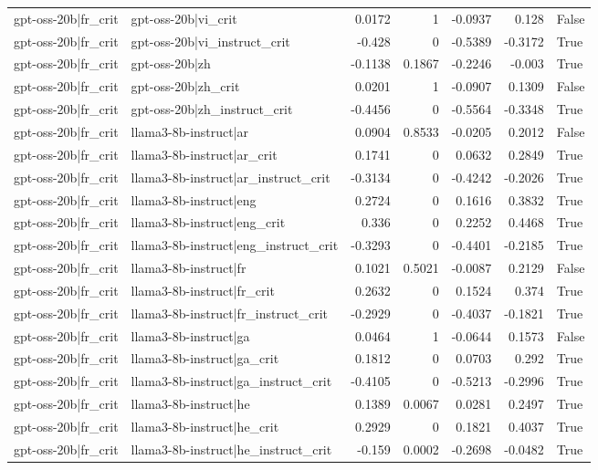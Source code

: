 \begin{table}
\begin{tabular}{l l r r r r l}
gpt-oss-20b|fr_crit & gpt-oss-20b|vi_crit & 0.0172 & 1 & -0.0937 & 0.128 & False \\
gpt-oss-20b|fr_crit & gpt-oss-20b|vi_instruct_crit & -0.428 & 0 & -0.5389 & -0.3172 & True \\
gpt-oss-20b|fr_crit & gpt-oss-20b|zh & -0.1138 & 0.1867 & -0.2246 & -0.003 & True \\
gpt-oss-20b|fr_crit & gpt-oss-20b|zh_crit & 0.0201 & 1 & -0.0907 & 0.1309 & False \\
gpt-oss-20b|fr_crit & gpt-oss-20b|zh_instruct_crit & -0.4456 & 0 & -0.5564 & -0.3348 & True \\
gpt-oss-20b|fr_crit & llama3-8b-instruct|ar & 0.0904 & 0.8533 & -0.0205 & 0.2012 & False \\
gpt-oss-20b|fr_crit & llama3-8b-instruct|ar_crit & 0.1741 & 0 & 0.0632 & 0.2849 & True \\
gpt-oss-20b|fr_crit & llama3-8b-instruct|ar_instruct_crit & -0.3134 & 0 & -0.4242 & -0.2026 & True \\
gpt-oss-20b|fr_crit & llama3-8b-instruct|eng & 0.2724 & 0 & 0.1616 & 0.3832 & True \\
gpt-oss-20b|fr_crit & llama3-8b-instruct|eng_crit & 0.336 & 0 & 0.2252 & 0.4468 & True \\
gpt-oss-20b|fr_crit & llama3-8b-instruct|eng_instruct_crit & -0.3293 & 0 & -0.4401 & -0.2185 & True \\
gpt-oss-20b|fr_crit & llama3-8b-instruct|fr & 0.1021 & 0.5021 & -0.0087 & 0.2129 & False \\
gpt-oss-20b|fr_crit & llama3-8b-instruct|fr_crit & 0.2632 & 0 & 0.1524 & 0.374 & True \\
gpt-oss-20b|fr_crit & llama3-8b-instruct|fr_instruct_crit & -0.2929 & 0 & -0.4037 & -0.1821 & True \\
gpt-oss-20b|fr_crit & llama3-8b-instruct|ga & 0.0464 & 1 & -0.0644 & 0.1573 & False \\
gpt-oss-20b|fr_crit & llama3-8b-instruct|ga_crit & 0.1812 & 0 & 0.0703 & 0.292 & True \\
gpt-oss-20b|fr_crit & llama3-8b-instruct|ga_instruct_crit & -0.4105 & 0 & -0.5213 & -0.2996 & True \\
gpt-oss-20b|fr_crit & llama3-8b-instruct|he & 0.1389 & 0.0067 & 0.0281 & 0.2497 & True \\
gpt-oss-20b|fr_crit & llama3-8b-instruct|he_crit & 0.2929 & 0 & 0.1821 & 0.4037 & True \\
gpt-oss-20b|fr_crit & llama3-8b-instruct|he_instruct_crit & -0.159 & 0.0002 & -0.2698 & -0.0482 & True \\

\end{tabular}
\end{table}
